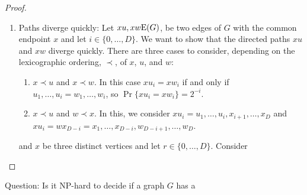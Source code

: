 \documentclass{patmorin}
\begin{document}
\begin{proof}
\begin{enumerate}
     \item Paths diverge quickly:  
      Let $xu,xw\mathrm{E}(G)$, be two edges of $G$ with the common endpoint $x$
      and let $i\in\{0,\ldots,D\}$.  We want to show that the directed
      paths $xu$ and $xw$ diverge quickly.  There are three cases to
      consider, depending on the lexicographic ordering, $\prec$, of $x$,
      $u$, and $w$:
     \begin{enumerate}
        \item $x\prec u$ and $x\prec w$.  In this case $xu_i=xw_i$ if and only if $u_1,\ldots,u_i=w_1,\ldots,w_i$, so $\Pr\{xu_i=xw_i\}= 2^{-i}$. 

        \item $x\prec u$ and $w\prec x$.  In this, we consider $xu_i=u_1,\ldots,u_i,x_{i+1},\ldots,x_D$ and $xu_i=wx_{D-i}=x_1,\ldots,x_{D-i},w_{D-i+1},\ldots,w_D$.
     \end{enumerate}


and $x$ be three distinct vertices and let
      $r\in\{0,\ldots,D\}$.  Consider

    \end{enumerate}

\end{proof}





Question: Is it NP-hard to decide if a  graph $G$ has a 



\end{document}
